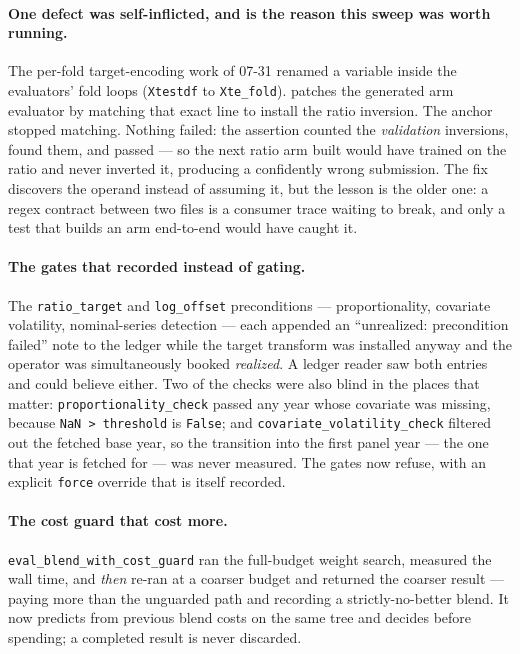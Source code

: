 \documentclass[11pt,a4paper]{article}
\begin{document}
\paragraph{One defect was self-inflicted, and is the reason this sweep was worth running.}
The per-fold target-encoding work of 07-31 renamed a variable inside the evaluators' fold
loops (\texttt{Xtestdf} to \texttt{Xte\_fold}).  patches the generated
arm evaluator by matching that exact line to install the ratio inversion. The anchor stopped
matching. Nothing failed: the assertion counted the \emph{validation} inversions, found
them, and passed --- so the next ratio arm built would have trained on the ratio and never
inverted it, producing a confidently wrong submission. The fix discovers the operand instead
of assuming it, but the lesson is the older one: a regex contract between two files is a
consumer trace waiting to break, and only a test that builds an arm end-to-end would have
caught it.

\paragraph{The gates that recorded instead of gating.} The \texttt{ratio\_target} and
\texttt{log\_offset} preconditions --- proportionality, covariate volatility, nominal-series
detection --- each appended an ``unrealized: precondition failed'' note to the ledger while
the target transform was installed anyway and the operator was simultaneously booked
\emph{realized}. A ledger reader saw both entries and could believe either. Two of the
checks were also blind in the places that matter: \texttt{proportionality\_check} passed any
year whose covariate was missing, because \texttt{NaN > threshold} is \texttt{False}; and
\texttt{covariate\_volatility\_check} filtered out the fetched base year, so the transition
into the first panel year --- the one that year is fetched for --- was never measured. The
gates now refuse, with an explicit \texttt{force} override that is itself recorded.

\paragraph{The cost guard that cost more.} \texttt{eval\_blend\_with\_cost\_guard} ran the
full-budget weight search, measured the wall time, and \emph{then} re-ran at a coarser
budget and returned the coarser result --- paying more than the unguarded path and recording
a strictly-no-better blend. It now predicts from previous blend costs on the same tree and
decides before spending; a completed result is never discarded.
\end{document}
